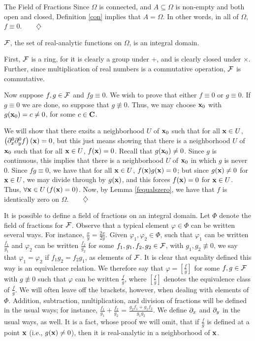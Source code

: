 \begin{section}{The Field of Fractions}
Since $\Omega$ is connected, and $A \subseteq \Omega$ is non-empty and both open and closed, Definition \ref{con} implies that $A = \Omega$.  In other words, in all of $\Omega$, $f \equiv 0$.$\qquad \diamondsuit$

\begin{theorem}
\label{intdomain}
$\mathcal{F}$, the set of real-analytic functions on $\Omega$, is an integral domain.
\end{theorem}

\proof
First, $\mathcal{F}$ is a ring, for it is clearly a group under $+$, and is clearly closed under $\times$.  Further, since multiplication of real numbers is a commutative operation, $\mathcal{F}$ is commutative.

Now suppose $f, g \in \mathcal{F}$ and $f g \equiv 0$.  We wish to prove that either $f \equiv 0$ or $g \equiv 0$. If $g \equiv 0$ we are done, so suppose that $g \not\equiv 0$.  Thus, we may choose $\mathbf{x}_0$ with $g(\mathbf{x}_0) = c \not= 0$, for some $c \in \mathbf{C}$.

We will show that there exsits a neighborhood $U$ of $\mathbf{x}_0$ such that for all $\mathbf{x} \in U$, $\left( \partial_{x}^0 \partial_{y}^0 f \right) (\mathbf{x}) = 0$, but this just means showing that there is a neighborhood $U$ of $\mathbf{x}_0$ such that for all $\mathbf{x} \in U$, $f(\mathbf{x}) = 0$.  Recall that $g(\mathbf{x}_0) \not= 0$.  Since $g$ is continuous, this implies that there is a neighborhood $U$ of $\mathbf{x}_0$ in which $g$ is never $0$.  Since $f g \equiv 0$, we have that for all $\mathbf{x} \in U$, $f(\mathbf{x})g(\mathbf{x}) = 0$; but since $g(\mathbf{x}) \not= 0$ for $\mathbf{x} \in U$, we may divide through by $g(\mathbf{x})$, and this forces $f(\mathbf{x}) = 0$ for $\mathbf{x} \in U$.  Thus, $\forall\mathbf{x} \in U \left( f(\mathbf{x}) = 0 \right)$.  Now, by Lemma \ref{fequalszero}, we have that $f$ is identically zero on $\Omega$.$\qquad \diamondsuit$

\eex

It is possible to define a field of fractions on an integral domain.  Let $\Phi$ denote the field of fractions for $\mathcal{F}$.  Observe that a typical element $\varphi \in \Phi$ can be written several ways.  For instance, $\frac{x}{y} = \frac{2x}{2y}$.  Given $\varphi_1, \varphi_2 \in \Phi$, such that $\varphi_1$ can be written $\frac{f_1}{g_1}$ and $\varphi_2$ can be written $\frac{f_2}{g_2}$ for some $f_1, g_1, f_2, g_2 \in \mathcal{F}$, with $g_1, g_2 \not\equiv 0$, we say that $\varphi_1 = \varphi_2$ if $f_1 g_2 = f_2 g_1$, as elements of $\mathcal{F}$.  It is clear that equality defined this way is an equivalence relation.  We therefore say that $\varphi = \left[ \frac{f}{g} \right]$ for some $f, g \in \mathcal{F}$ with $g \not\equiv 0$ such that $\varphi$ can be written $\frac{f}{g}$, where $\left[ \frac{f}{g} \right]$ denotes the equivalence class of $\frac{f}{g}$.  We will often leave off the brackets, however, when dealing with elements of $\Phi$.  Addition, subtraction, multiplication, and division of fractions will be defined in the usual ways; for instance, $\frac{f_1}{g_1} + \frac{f_2}{g_2}$ = $\frac{g_2 f_1 + g_1 f_2}{g_1 g_2}$.  We define $\partial_{x}$ and $\partial_{y}$ in the usual ways, as well.  It is a fact, whose proof we will omit, that if $\frac{f}{g}$ is defined at a point $\mathbf{x}$ (i.e., $g(\mathbf{x}) \not= 0$), then it is real-analytic in a neighborhood of $\mathbf{x}$.


\end{section}

